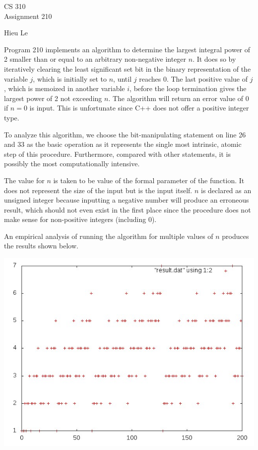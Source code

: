 \documentclass[12pt]{article}
\begin{document}
\thispagestyle{empty}

\begin{center}
{\large CS 310}\\
Assignment 210
\end{center}

\begin{flushright}
Hieu Le
\end{flushright}

Program 210 implements an algorithm to determine the largest integral
power of 2 smaller than or equal to an arbitrary non-negative
integer $n$. It does so by iteratively clearing the least significant set bit 
in the binary representation of the variable $j$, which is initially set to $n$, 
until $j$ reaches 0. The last positive value of $j$, which is memoized in another 
variable $i$, before the loop termination gives the largest power of 2 not 
exceeding $n$. The algorithm will return an error value of 0 if $n = 0$ is input. 
This is unfortunate since C++ does not offer a positive integer type. 

To analyze this algorithm, we choose the bit-manipulating statement on line 26
 and 33 as the basic operation as it represents the single most intrinsic, atomic
 step of this procedure. Furthermore, compared with other statements, it is 
 possibly the most computationally intensive.

The value for $n$ is taken to be value of the formal parameter of the function. 
It does not represent the size of the input but is the input itself. $n$ is 
declared as an unsigned integer because inputting a negative number will 
produce an erroneous result, which should not even exist in the first place 
since the procedure does not make sense for non-positive integers 
(including 0).

An empirical analysis of running the algorithm for multiple values of
$n$ produces the results shown below.

\begin{center}
\scalebox{.5} {\includegraphics{plot}}
\end{center}
\end{document}
